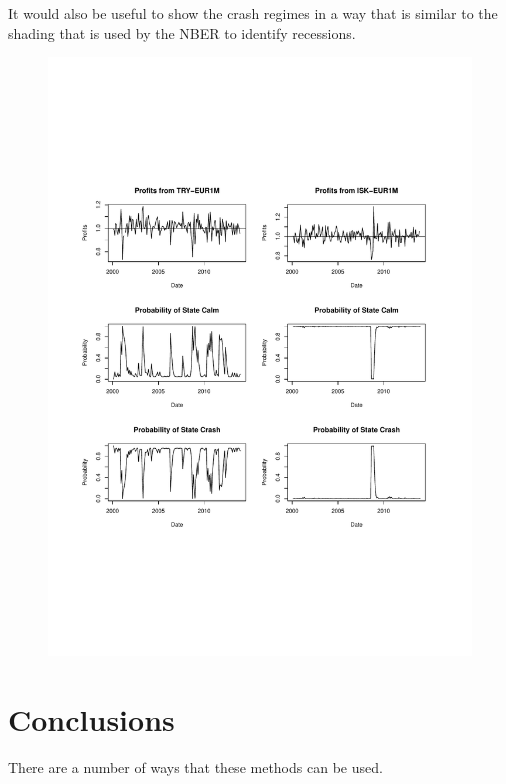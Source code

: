 \documentclass[12pt, a4paper, oneside]{article} %
\begin{document}
It would also be useful to show the crash regimes in a way that is similar to the shading that is used by the NBER to identify recessions.   

 
\begin{figure}[h!]
\centering
\includegraphics[scale = .80]{../Figures/2RegProb/ISKTRYEUR.pdf}
\end{figure}


\section{Conclusions}
There are a number of ways that these methods can be used. 
\end{document}
